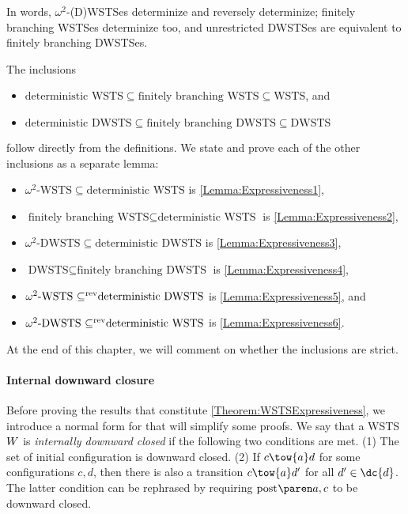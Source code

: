 \documentclass[../../diss.tex]{subfiles}
\begin{document}
In words, $\omega^2$-(D)WSTSes determinize and reversely determinize; finitely branching WSTSes determinize too, and unrestricted DWSTSes are equivalent to finitely branching DWSTSes.

The inclusions
\begin{itemize}
    \item
        $\text{deterministic WSTS} \subseteq  \text{finitely branching WSTS} \subseteq \text{WSTS}$, and
    \item
        $\text{deterministic DWSTS} \subseteq  \text{finitely branching DWSTS} \subseteq \text{DWSTS}$
\end{itemize}
follow directly from the definitions.
We state and prove each of the other inclusions as a separate lemma:
\begin{itemize}
    \item
        $\text{$\omega^2$-WSTS} \subseteq  \text{deterministic WSTS}$
        is \cref{Lemma:Expressiveness1},
    \item
        $\text{finitely branching WSTS} \subseteq  \text{deterministic WSTS}$
        is \cref{Lemma:Expressiveness2},
    \item
        $\text{$\omega^2$-DWSTS} \subseteq  \text{deterministic DWSTS}$
        is \cref{Lemma:Expressiveness3},
    \item
        $\text{DWSTS} \subseteq \text{finitely branching DWSTS}$
        is \cref{Lemma:Expressiveness4},
    \item
        $\text{$\omega^2$-WSTS} \ {\mathrel{\subseteq^{\text{rev}}}} \text{deterministic DWSTS}$
        is \cref{Lemma:Expressiveness5}, and
    \item
        $\text{$\omega^2$-DWSTS} \ {\mathrel{\subseteq^{\text{rev}}}} \text{deterministic WSTS}$
        is \cref{Lemma:Expressiveness6}.
\end{itemize}

At the end of this chapter, we will comment on whether the inclusions are strict.

\paragraph{Internal downward closure}

Before proving the results that constitute \cref{Theorem:WSTSExpressiveness}, we introduce a normal form for  that will simplify some proofs.
We say that a WSTS $W$ is \emph{internally downward closed} if the following two conditions are met.
(1) The set of initial configuration is downward closed.
(2) If $c \tow{a} d$ for some configurations $c,d$, then there is also a transition $c \tow{a} d'$ for all $d' \in \dc{d}$.
The latter condition can be rephrased by requiring $\post{}{a}{c}$ to be downward closed.
\end{document}
